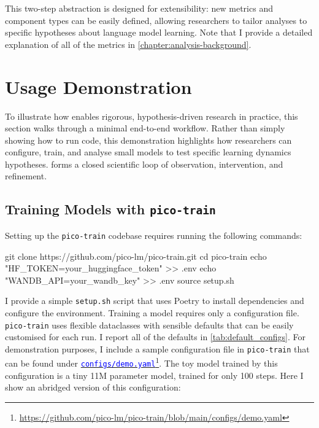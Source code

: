 This two-step abstraction is designed for extensibility: new metrics and component types can be easily defined, allowing researchers to tailor analyses to specific hypotheses about language model learning. Note that I provide a detailed explanation of all of the metrics in \cref{chapter:analysis-background}.

\section{Usage Demonstration} 
\label{sec:pico-demo}

To illustrate how \pico enables rigorous, hypothesis-driven research in practice, this section walks through a minimal end-to-end workflow. Rather than simply showing how to run code, this demonstration highlights how researchers can configure, train, and analyse small models to test specific learning dynamics hypotheses. \pico forms a closed scientific loop of observation, intervention, and refinement.

\subsection{Training Models with \texttt{pico-train}}

Setting up the \texttt{pico-train} codebase requires running the following commands:

\begin{center}
    \begin{codelisting}
        git clone https://github.com/pico-lm/pico-train.git
        cd pico-train
        echo "HF_TOKEN=your_huggingface_token" >> .env
        echo "WANDB_API=your_wandb_key" >> .env
        source setup.sh
    \end{codelisting}
\end{center}

I provide a simple \verb|setup.sh| script that uses Poetry \citep{poetry} to install dependencies and configure the environment. Training a model requires only a configuration file. \texttt{pico-train} uses flexible dataclasses with sensible defaults that can be easily customised for each run. I report all of the defaults in \cref{tab:default_configs}. For demonstration purposes, I include a sample configuration file in \texttt{pico-train} that can be found under \href{https://github.com/pico-lm/pico-train/blob/main/configs/demo.yaml}{\textcolor{blue}{\texttt{configs/demo.yaml}}}\footnote{\url{https://github.com/pico-lm/pico-train/blob/main/configs/demo.yaml}}. The toy model trained by this configuration is a tiny 11M parameter model, trained for only 100 steps. Here I show an abridged version of this configuration:


